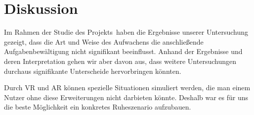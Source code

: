 \chapter{Diskussion}

Im Rahmen der Studie des Projekts \projectName \,haben die Ergebnisse unserer Untersuchung gezeigt, dass die Art und Weise des Aufwachens die anschließende Aufgabenbewältigung nicht signifikant beeinflusst.
Anhand der Ergebnisse und deren Interpretation gehen wir aber davon aus, dass weitere Untersuchungen durchaus signifikante Unterscheide hervorbringen könnten.

Durch VR und AR können spezielle Situationen simuliert werden, die man einem Nutzer ohne diese Erweiterungen nicht darbieten könnte. Deshalb war es für uns die beste Möglichkeit ein konkretes Ruheszenario aufzubauen.